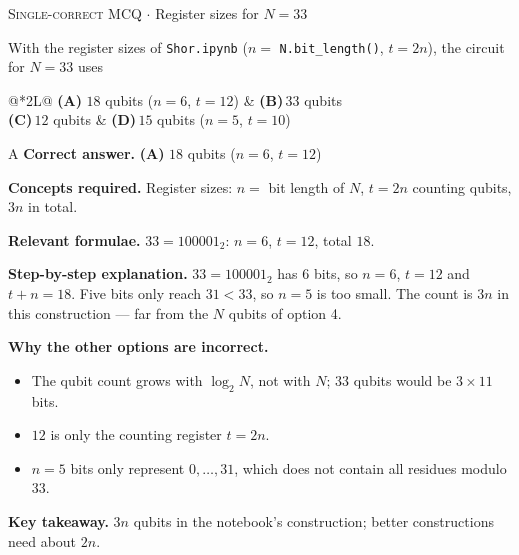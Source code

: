 \documentclass[11pt,a4paper]{article}
\newcommand{\optlabel}[1]{\textbf{(#1)}}
\newcommand{\correctlabel}[1]{\textcolor{okgreen}{\textbf{(#1)}\,\ding{51}}}
\newenvironment{qitem}[1]{\begin{list}{}{\setlength{\leftmargin}{3.3em}\setlength{\labelwidth}{3.1em}%
  \setlength{\labelsep}{0.2em}\setlength{\topsep}{3pt}\setlength{\parsep}{3pt}}\item[\textbf{Q.#1}\hfill]}{\end{list}}
\newcommand{\qsep}{\par\vspace{2pt}{\color{black!15}\hrule}\vspace{4pt}}
\newcommand{\qmeta}[2]{{\footnotesize\color{black!60}\textsc{#1} \;$\cdot$\; #2}\par}
\begin{document}
\begin{qitem}{46}
\qmeta{Single-correct MCQ}{Register sizes for $N = 33$}
With the register sizes of \texttt{Shor.ipynb} ($n = $ \texttt{N.bit\_length()}, $t = 2n$), the circuit for $N = 33$ uses
\par\smallskip\noindent\begin{tabularx}{\linewidth}{@{}*{2}{L}@{}}
\correctlabel{A}\,$18$ qubits ($n = 6$, $t = 12$) & \optlabel{B}\,$33$ qubits \\[3pt]
\optlabel{C}\,$12$ qubits & \optlabel{D}\,$15$ qubits ($n = 5$, $t = 10$)
\end{tabularx}
\end{qitem}
\begin{solbox}{A}
\textbf{\color{brand}Correct answer.} \textcolor{okgreen}{\textbf{(A)}} $18$ qubits ($n = 6$, $t = 12$)

\textbf{\color{brand}Concepts required.} Register sizes: $n = $ bit length of $N$, $t = 2n$ counting qubits, $3n$ in total.

\textbf{\color{brand}Relevant formulae.} $33 = 100001_2$: $n = 6$, $t = 12$, total $18$.

\textbf{\color{brand}Step-by-step explanation.} $33 = 100001_2$ has $6$ bits, so $n = 6$, $t = 12$ and $t + n = 18$. Five bits only reach $31 < 33$, so $n = 5$ is too small. The count is $3n$ in this construction
--- far from the $N$ qubits of option 4.

\textbf{\color{brand}Why the other options are incorrect.}
\begin{itemize}[leftmargin=2.4em, itemsep=1pt, topsep=2pt]
\item[\textbf{(B)}] The qubit count grows with $\log_2N$, not with $N$; $33$ qubits would be $3\times11$ bits.
\item[\textbf{(C)}] $12$ is only the counting register $t = 2n$.
\item[\textbf{(D)}] $n = 5$ bits only represent $0, \dots, 31$, which does not contain all residues modulo $33$.
\end{itemize}
\textbf{\color{brand}Key takeaway.} $3n$ qubits in the notebook's construction; better constructions need about $2n$.
\end{solbox}
\qsep
\end{document}

